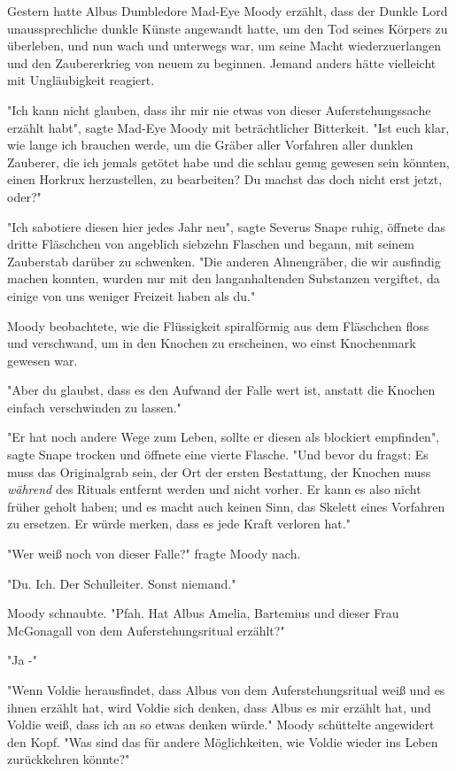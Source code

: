 {Gestern hatte Albus Dumbledore Mad-Eye Moody erzählt, dass der Dunkle Lord unaussprechliche dunkle Künste angewandt hatte, um den Tod seines Körpers zu überleben, und nun wach und unterwegs war, um seine Macht wiederzuerlangen und den Zaubererkrieg von neuem zu beginnen. Jemand anders hätte vielleicht mit Ungläubigkeit reagiert.

"Ich kann nicht glauben, dass ihr mir nie etwas von dieser Auferstehungssache erzählt habt", sagte Mad-Eye Moody mit beträchtlicher Bitterkeit. "Ist euch klar, wie lange ich brauchen werde, um die Gräber aller Vorfahren aller dunklen Zauberer, die ich jemals getötet habe und die schlau genug gewesen sein könnten, einen Horkrux herzustellen, zu bearbeiten? Du machst das doch nicht erst jetzt, oder?"

"Ich sabotiere diesen hier jedes Jahr neu", sagte Severus Snape ruhig, öffnete das dritte Fläschchen von angeblich siebzehn Flaschen und begann, mit seinem Zauberstab darüber zu schwenken. "Die anderen Ahnengräber, die wir ausfindig machen konnten, wurden nur mit den langanhaltenden Substanzen vergiftet, da einige von uns weniger Freizeit haben als du."

Moody beobachtete, wie die Flüssigkeit spiralförmig aus dem Fläschchen floss und verschwand, um in den Knochen zu erscheinen, wo einst Knochenmark gewesen war.

"Aber du glaubst, dass es den Aufwand der Falle wert ist, anstatt die Knochen einfach verschwinden zu lassen."

"Er hat noch andere Wege zum Leben, sollte er diesen als blockiert empfinden", sagte Snape trocken und öffnete eine vierte Flasche. "Und bevor du fragst: Es muss das Originalgrab sein, der Ort der ersten Bestattung, der Knochen muss \emph{während} des Rituals entfernt werden und nicht vorher. Er kann es also nicht früher geholt haben; und es macht auch keinen Sinn, das Skelett eines Vorfahren zu ersetzen. Er würde merken, dass es jede Kraft verloren hat."

"Wer weiß noch von dieser Falle?" fragte Moody nach.

"Du. Ich. Der Schulleiter. Sonst niemand."

Moody schnaubte. "Pfah. Hat Albus Amelia, Bartemius und dieser Frau McGonagall von dem Auferstehungsritual erzählt?"

"Ja -"

"Wenn Voldie herausfindet, dass Albus von dem Auferstehungsritual weiß und es ihnen erzählt hat, wird Voldie sich denken, dass Albus es mir erzählt hat, und Voldie weiß, dass ich an so etwas denken würde." Moody schüttelte angewidert den Kopf. "Was sind das für andere Möglichkeiten, wie Voldie wieder ins Leben zurückkehren könnte?"

}
